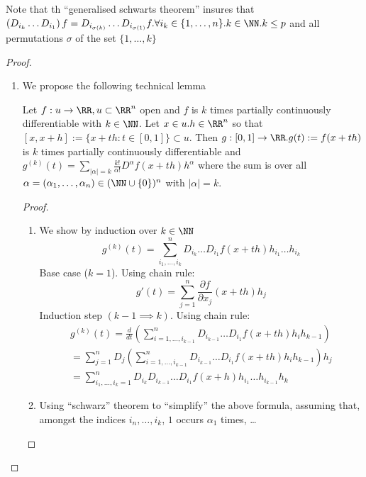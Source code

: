Note that th  ``generalised schwarts theorem'' insures that $\left( D_{i_k}\dots D_{i_1} \right) f = D_{i_{\sigma(k)}} \dots D_{i_{\sigma(1)}} f. \forall i_k \in \{1, \dots, n\}. k \in \NN . k \leq p $ and all permutations $\sigma$ of the set $\{1, \dots, k\}$   

\begin{proof} \par
  \begin{enumerate}
  \item We propose the following technical lemma
    \begin{lem}
      Let $f: u \to \RR, u \subset \RR^n$ open and $f$ is $k$ times partially continuously differentiable with $k\in \NN$. Let $x \in u. h\in \RR^n$ so that $[x, x+h] := \{x+th: t \in [0, 1]\} \subset u$. Then $g: [0,1] \to \RR. g(t):=f(x+th)$ is $k$ times partially continuously differentiable and $g^{(k)}(t) = \sum_{|\alpha|=k}\frac{k!}{\alpha!}D^\alpha f(x+th) h^\alpha$ where the sum is over all $\alpha = (\alpha_1, \dots, \alpha_n) \in (\NN \cup \{0\})^n$ with $|\alpha| = k$.
    \end{lem}

    \begin{proof}
      \begin{enumerate}
      \item We show by induction over $k \in \NN$
        \begin{equation*}
          g^{(k)}(t) = \sum_{i_1, \dots, i_k}^n D_{i_k} \dots D_{i_1}f(x+th)h_{i_1} \dots h_{i_k}
        \end{equation*}
      Base case ($k = 1$). Using chain rule:
        \begin{equation*}
          g'(t) = \sum^n_{j=1} \frac{\partial f}{\partial x_j}(x+th)h_j
        \end{equation*}
      Induction step $(k - 1 \implies k)$. Using chain rule:
        \begin{align*}
          g^{(k)}(t) = \frac{d}{dt}\left(\sum^n_{i=1, \dots, i_{k-1}}D_{i_{k-1}} \dots D_{i_1} f(x+th)h_ih_{k-1} \right) \\
          = \sum^n_{j=1}D_j\left(\sum^n_{i=1, \dots, i_{k-1}}D_{i_{k-1}} \dots D_{i_1} f(x+th)h_ih_{k-1} \right)h_j \\
          = \sum^n_{i_1, \dots, i_k = 1}D_{i_k}D_{i_{k-1}}\dots D_{i_1}f(x+h)h_{i_1}\dots h_{i_{k-1}}h_k
        \end{align*}

      \item Using ``schwarz'' theorem to ``simplify'' the above formula, assuming that, amongst the indices $i_n, \dots, i_k$, $1$ occurs $\alpha_1$ times, \dots
      \end{enumerate}
    \end{proof}

  \end{enumerate}
\end{proof}
